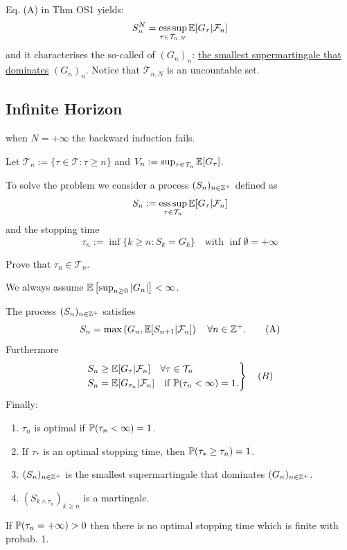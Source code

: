 \begin{remark}
    Eq. (A) in Thm OS1 yields:
    $$S_n^N = \operatorname*{ess\,sup}_{\tau \in \mathcal{T}_{n,N}} \mathbb E[G_\tau | \mathcal{F}_n]$$
    and it characterises the so-called  of $(G_n)_n$: \underline{the smallest supermartingale that dominates} $(G_n)_n$.
    Notice that $\mathcal{T}_{n,N}$ is an uncountable set.
\end{remark}

\subsection{Infinite Horizon}

 when $N = +\infty$ the backward induction fails.

Let $\mathcal{T}_n := \{\tau \in \mathcal{T} : \tau \ge n\}$ and $V_n := \sup_{\tau \in \mathcal{T}_n} \mathbb E[G_\tau]$.

To solve the problem we consider a process $(S_n)_{n \in \mathbb Z^+}$ defined as
$$S_n := \operatorname*{ess\,sup}_{\tau \in \mathcal{T}_n} \mathbb E[G_\tau | \mathcal{F}_n]$$
and the stopping time
$$\tau_n := \inf \{k \ge n : S_k = G_k\} \quad \text{with } \inf \emptyset = +\infty$$

\begin{homework}
    Prove that $\tau_n \in \mathcal{T}_n$.
\end{homework}

We always assume $\mathbb E\left[ \sup_{n \ge 0} |G_n| \right] < \infty$.

\begin{theorem}[OS2]
    The process $(S_n)_{n \in \mathbb Z^+}$ satisfies
    \begin{equation} \label{eq:A_inf}
        S_n = \max \left( G_n, \mathbb E[S_{n+1} | \mathcal{F}_n] \right) \quad \forall n \in \mathbb Z^+. \tag{A}
    \end{equation}
    Furthermore
    \begin{equation} \label{eq:B_inf}
        \left.
        \begin{aligned}
            S_n &\ge \mathbb E[G_\tau | \mathcal{F}_n] \quad \forall \tau \in \mathcal{T}_n \\
            S_n &= \mathbb E[G_{\tau_n} | \mathcal{F}_n] \quad \text{if } \mathbb P(\tau_n < \infty) = 1.
        \end{aligned}
        \right\} \quad (B)
    \end{equation}
    Finally:
    \begin{enumerate}[label=(\roman*)]
        \item $\tau_n$ is optimal if $\mathbb P(\tau_n < \infty) = 1$.
        \item If $\tau_*$ is an optimal stopping time, then $\mathbb P(\tau_* \ge \tau_n) = 1$.
        \item $(S_n)_{n \in \mathbb Z^+}$ is the smallest supermartingale that dominates $(G_n)_{n \in \mathbb Z^+}$.
        \item $(S_{k \wedge \tau_n})_{k \ge n}$ is a martingale.
    \end{enumerate}
    If $\mathbb P(\tau_n = +\infty) > 0$ then there is no optimal stopping time which is finite with probab. 1.
\end{theorem}

